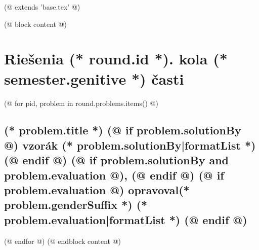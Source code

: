 (@ extends 'base.tex' @)

(@ block content @)
    

    \pagestyle{solutions-(* competition.id *)-(* volume.id *)-(* semester.id *)-(* round.id *)}
    \thispagestyle{first-(* competition.id *)-(* volume.id *)-(* semester.id *)}
    \afterpage{\aftergroup\restoregeometry}%

    \section{\texorpdfstring{Riešenia (* round.id *). kola (* semester.genitive *) časti}{Riešenia}}

    (@ for pid, problem in round.problems.items() @)%
    \setcounter{volume}{(* volume.number *)}%
    \setcounter{semester}{(* semester.number *)}%
    \setcounter{round}{(* round.number *)}%
    \setcounter{problem}{(* problem.number *)}%

    \subsection{%
        \texorpdfstring{%
            \large \textbf{(* problem.title *)} \hfill \normalsize%
            (@ if problem.solutionBy @)%
                vzorák (* problem.solutionBy|formatList *)%
            (@ endif @)%
            (@ if problem.solutionBy and problem.evaluation @), (@ endif @)%
            (@ if problem.evaluation @)%
                opravoval(* problem.genderSuffix *) (* problem.evaluation|formatList *)%
            (@ endif @)%
        }{(* round.number *).(* problem.number *) (* problem.title *)}%
    }

    (@ endfor @)
(@ endblock content @)
